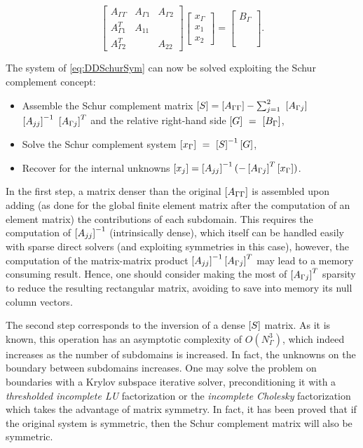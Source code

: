 \begin{equation}
\label{eq:DDSchurSym}
\begin{bmatrix}
A_{\Gamma\Gamma} & A_{\Gamma1} & A_{\Gamma2}\\
A_{\Gamma1}^T & A_{11} & \\
A_{\Gamma2}^T &  & A_{22}
\end{bmatrix}
\begin{bmatrix}
x_{\Gamma}\\
x_{1}\\
x_{2}
\end{bmatrix}
=
\begin{bmatrix}
B_{\Gamma}\\
\phantom{B}\\
\phantom{B}
\end{bmatrix}.
\end{equation}

The system of \eqref{eq:DDSchurSym} can now be solved exploiting the Schur complement concept:

\begin{itemize}
\item Assemble the Schur complement matrix $\left[S\right] = \left[A_{\Gamma\Gamma}\right] - \sum_{j=1}^2~\left[A_{\Gamma j}\right]$ $\left[A_{jj}\right]^{-1}~\left[A_{\Gamma j}\right]^T$ and the relative right-hand side $\left[G\right]~=~\left[B_{\Gamma}\right]$,
\item Solve the Schur complement system $\left[x_\Gamma\right]~=~\left[S\right]^{-1} \left[G\right]$,
\item Recover for the internal unknowns $\left[x_j\right] = \left[A_{jj}\right]^{-1} (-\left[A_{\Gamma j}\right]^T \left[x_\Gamma\right])$.
\end{itemize}

In the first step, a matrix denser than the original $\left[A_{\Gamma\Gamma}\right]$ is assembled upon adding (as done for the global finite element matrix after the computation of an element matrix) the contributions of each subdomain. This requires the computation of $\left[A_{jj}\right]^{-1}$ (intrinsically dense), which itself can be handled easily with sparse direct solvers (and exploiting symmetries in this case), however, the computation of the matrix-matrix product $\left[A_{jj}\right]^{-1} \left[A_{\Gamma j}\right]^T$ may lead to a memory consuming result. Hence, one should consider making the most of $\left[A_{\Gamma j}\right]^T$ sparsity to reduce the resulting rectangular matrix, avoiding to save into memory its null column vectors.

The second step corresponds to the inversion of a dense $\left[S\right]$ matrix. As it is known, this operation has an asymptotic complexity of $O(N_\Gamma^3)$, which indeed increases as the number of subdomains is increased. In fact, the unknowns on the boundary between subdomains increases. One may solve the problem on boundaries with a Krylov subspace iterative solver, preconditioning it with a \textit{thresholded incomplete LU} factorization  \cite{saad1994ilut} or the \textit{incomplete Cholesky} factorization which takes the advantage of matrix symmetry. In fact, it has been proved \cite{mathew2008domain} that if the original system is symmetric, then the Schur complement matrix will also be symmetric.

